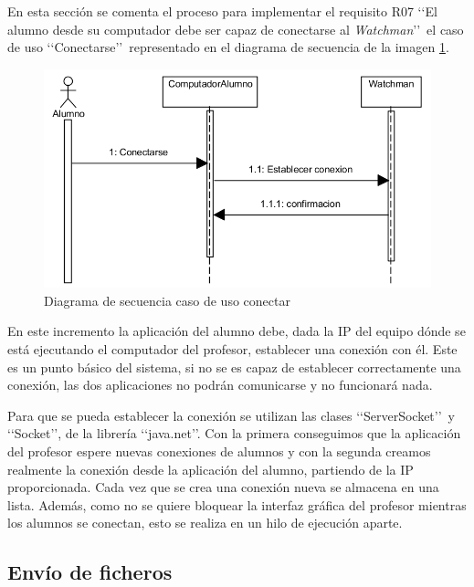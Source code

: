 En esta sección se comenta el proceso para implementar el requisito R07 \lq \lq El alumno desde su computador debe ser capaz de conectarse al \emph{Watchman}\rq \rq \ el caso de uso \lq \lq Conectarse\rq \rq \ representado en el diagrama de secuencia de la imagen \ref{fig:iteracion1:casosUso}. 
\newline

\begin{figure}
    \centering
    \includegraphics[width=.90\linewidth]{iteracion1/secConectar}
    \caption{Diagrama de secuencia caso de uso conectar}
    \label{fig:iteracion1:casosUso}
\end{figure}

En este incremento la aplicación del alumno debe, dada la IP del equipo dónde se está ejecutando el computador del profesor, establecer una conexión con él. Este es un punto básico del sistema, si no se es capaz de establecer correctamente una conexión, las dos aplicaciones no podrán comunicarse y no funcionará nada.
\newline

Para que se pueda establecer la conexión se utilizan las clases \lq \lq ServerSocket\rq \rq \  y \lq \lq Socket\rq \rq, de la librería \lq \lq java.net\rq \rq\cite{JAVA:1998, JAVANET:2010}. Con la primera conseguimos que la aplicación del profesor espere nuevas conexiones de alumnos y con la segunda creamos realmente la conexión desde la aplicación del alumno, partiendo de la IP proporcionada. Cada vez que se crea una conexión nueva se almacena en una lista. Además, como no se quiere bloquear la interfaz gráfica\cite{GUI:1999} del profesor mientras los alumnos se conectan, esto se realiza en un hilo de ejecución\cite{THREAD:2004} aparte.


\subsection{Envío de ficheros}
\label{sec:iteracion1:envio}

